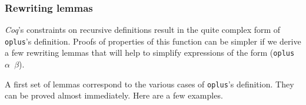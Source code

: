     \subsubsection{Rewriting lemmas}
    \label{sec:orgheadline86}

    \emph{Coq}'s constraints on recursive definitions result in 
    the quite  complex form of \texttt{oplus}'s definition.
    Proofs of properties of this function can be simpler if we
     derive a few  rewriting lemmas that will help to simplify 
    expressions of the form (\texttt{oplus $\alpha$ $\beta$}).

    A first set of lemmas correspond to the various cases of \texttt{oplus}'s 
    definition. They can be proved almost immediately. Here are a few examples.
    


   
    










